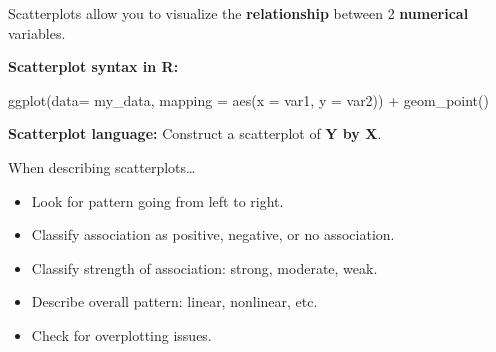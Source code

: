 \documentclass[
  letterpaper,
  DIV=11,
  numbers=noendperiod]{scrreprt}
\newenvironment{Shaded}{\begin{snugshade}}{\end{snugshade}}
\newcommand{\AttributeTok}[1]{\textcolor[rgb]{0.40,0.45,0.13}{#1}}
\newcommand{\FunctionTok}[1]{\textcolor[rgb]{0.28,0.35,0.67}{#1}}
\newcommand{\NormalTok}[1]{\textcolor[rgb]{0.00,0.23,0.31}{#1}}
\newcommand{\SpecialCharTok}[1]{\textcolor[rgb]{0.37,0.37,0.37}{#1}}
\providecommand{\tightlist}{%
  \setlength{\itemsep}{0pt}\setlength{\parskip}{0pt}}\usepackage{longtable,booktabs,array}
\begin{document}
\begin{tcolorbox}[enhanced jigsaw, breakable, colback=white, bottomrule=.15mm, leftrule=.75mm, colframe=quarto-callout-note-color-frame, arc=.35mm, rightrule=.15mm, toprule=.15mm, left=2mm, opacityback=0]
Scatterplots allow you to visualize the \textbf{relationship} between 2
\textbf{numerical} variables.

\textbf{Scatterplot syntax in R:}

\begin{Shaded}
\begin{Highlighting}[]
\FunctionTok{ggplot}\NormalTok{(}\AttributeTok{data=}\NormalTok{ my\_data, }\AttributeTok{mapping =} \FunctionTok{aes}\NormalTok{(}\AttributeTok{x =}\NormalTok{ var1, }\AttributeTok{y =}\NormalTok{ var2)) }\SpecialCharTok{+}
  \FunctionTok{geom\_point}\NormalTok{()}
\end{Highlighting}
\end{Shaded}

\textbf{Scatterplot language:} Construct a scatterplot of \textbf{Y by
X}.
\end{tcolorbox}

\begin{tcolorbox}[enhanced jigsaw, breakable, colback=white, bottomrule=.15mm, leftrule=.75mm, colframe=quarto-callout-note-color-frame, arc=.35mm, rightrule=.15mm, toprule=.15mm, left=2mm, opacityback=0]

When describing scatterplots\ldots{}

\begin{itemize}
\tightlist
\item
  Look for pattern going from left to right.
\item
  Classify association as positive, negative, or no association.
\item
  Classify strength of association: strong, moderate, weak.
\item
  Describe overall pattern: linear, nonlinear, etc.
\item
  Check for overplotting issues.
\end{itemize}

\end{tcolorbox}
\end{document}

